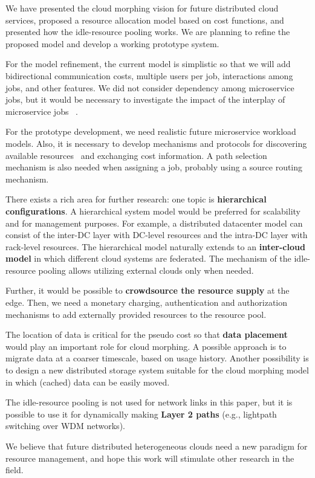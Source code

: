 
We have presented the cloud morphing vision for future distributed
cloud services,
proposed a resource allocation model based on cost functions,
and presented how the idle-resource pooling works.
We are planning to refine the proposed model and develop a working
prototype system.

For the model refinement,
the current model is simplistic so that we will add bidirectional
communication costs,
multiple users per job, interactions among jobs, and other features.
We did not consider dependency among microservice jobs, but it would be
necessary to investigate the impact of the interplay of microservice
jobs ~\cite{Suresh-SOA-SOCC2017}.

For the prototype development,
we need realistic future microservice workload models.
Also, it is necessary to develop mechanisms and protocols for
discovering available resources~\cite{Albrecht2008} and exchanging
cost information.
A path selection mechanism is also needed when assigning a job,
probably using a source routing mechanism.

There exists a rich area for further research:
one topic is {\bf hierarchical configurations}.
A hierarchical system model would be preferred for scalability
and for management purposes.
For example, a distributed datacenter model can consist of
the inter-DC layer with DC-level resources and the intra-DC layer
with rack-level resources.
The hierarchical model naturally extends to
an {\bf inter-cloud model} in which different cloud systems are
federated.
The mechanism of the idle-resource pooling allows utilizing external
clouds only when needed.

Further, it would be possible to {\bf crowdsource the resource supply}
at the edge. 
Then, we need a monetary charging, authentication and authorization
mechanisms to add externally provided resources to the resource pool.

The location of data is critical for the pseudo cost so that
{\bf data placement} would play an important role for cloud morphing. 
A possible approach is to migrate data at a coarser timescale, based
on usage history.
Another possibility is to design a new distributed storage system
suitable for the cloud morphing model in which (cached) data can be
easily moved.

The idle-resource pooling is not used for network links in this paper, but
it is possible to use it for dynamically making {\bf Layer 2 paths}
(e.g., lightpath switching over WDM networks).

We believe that future distributed heterogeneous clouds need a new
paradigm for resource management, and hope this work will stimulate
other research in the field.

